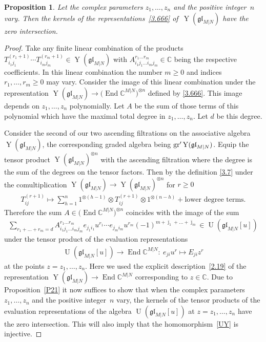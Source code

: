 \documentclass[10pt,a4paper]{amsart}
\numberwithin{equation}{section}
\newtheorem{Proposition}[Theorem]{Proposition}
\def\bj{{\bar\jmath }}
\def\CC{{\mathbb{C}}}
\def\CMN{\CC^{M|N}}
\def\End{\operatorname{End}}
\def\g{\glMN [u]}
\def\ge{\geqslant}
\def\glMN{\mathfrak{gl}_{M|N}}
\def\grpr{{\rm gr}^{\prime} }
\def\ot{\otimes}
\def\Ug{\operatorname{U}(\g)}
\def\YMN{\operatorname{Y}(\glMN)}
\begin{document}
\begin{Proposition}\label{P22}
Let the complex parameters $z_1,\dots, z_n$ and the positive integer~$n$ vary.
Then the kernels of the representations~\eqref{3.666} of~$\YMN$
have the zero intersection.
\end{Proposition}

\begin{proof}Take any finite linear combination of the products
$T_{i_1j_1}^{(r_1+1)}\cdots T_{i_mj_m}^{(r_m+1)}\in\YMN$ with
$
A_{i_1j_1\dots i_mj_m}^{r_1\dots r_m}\in\CC
$
being the respective coefficients.
In this linear combination the number $m\ge0$ and
indices $r_1,\dots, r_m\ge0$ may vary.
Consider the image of this linear combination
under the representation
$\YMN\to\big(\End\CMN\big)^{\ot n}$ defined by \eqref{3.666}.
This image depends on $z_1,\dots, z_n$ polynomially.
Let $A$ be the sum of those terms of
this polynomial which have the maximal total degree in $z_1,\dots, z_n $.
Let $d$ be this degree.

Consider the second of our two ascending filtrations
on the associative algebra $\YMN $,
the corresponding graded algebra being $\grpr\YMN $.
Equip the tensor product $\YMN^{\ot n}$ with the ascending
filtration where the degree is the sum of the degrees on the tensor factors.
Then by the definition \eqref{3.7}
under the comultiplication $\YMN\to\YMN^{\ot n}$ for $r\ge0$
\begin{gather*}
T_{ij}^{(r+1)}\mapsto
\sum_{h=1}^n
1^{\ot (h-1)}\ot T_{ij}^{(r+1)}\ot1^{\ot (n-h)}
 +
\text{lower degree terms.}
\end{gather*}
Therefore the sum $A\in\big(\End\CMN\big)^{\ot n}$
coincides with the image of the sum
\begin{gather*}
\sum_{r_1+\dots+r_m= d}
A_{i_1j_1\dots i_mj_m}^{r_1\dots r_m}
e_{j_1i_1} u^{r_1}\cdots e_{j_mi_m} u^{r_m}
(-1)^{m + \bj_1 + \dots + \bj_m}\in\Ug
\end{gather*}
under the tensor product of the evaluation representations
\begin{gather}\label{evalrep}
\Ug\to\End\CMN\colon \
e_{ji} u^{r}
\mapsto
E_{ji} z^{r}
\end{gather}
at the points $z=z_1,\dots, z_n $. Here we used the explicit
description~\eqref{2.19}
of the representation $\YMN\to\End\CMN$ corresponding to $z\in\CC $.
Due to Proposition~\ref{P21} it now
suffices to show that when the complex parameters $z_1,\dots, z_n$
and the positive integer~$n$ vary, the kernels
of the tensor products
of the evaluation representations
of the algebra $\Ug$ at $z=z_1,\dots, z_n$
have the zero intersection.
This will also imply that the homomorphism~\eqref{UY} is injective.


\end{proof}
\end{document}
